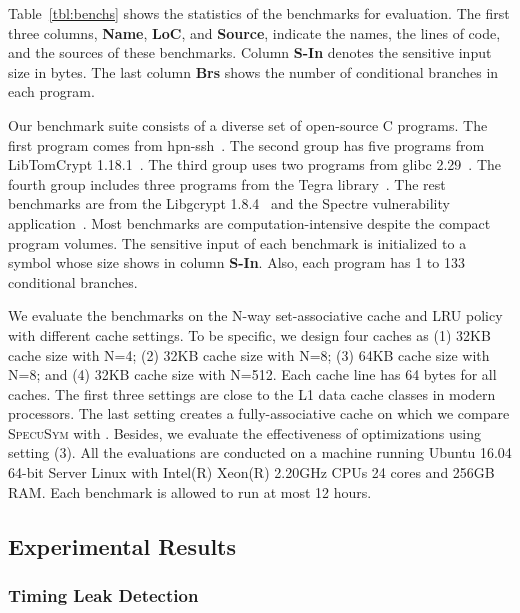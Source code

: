 \documentclass[sigconf,screen]{acmart}
\newcommand{\SpecuSym}{\textsc{SpecuSym} }
\begin{document}
Table~\ref{tbl:benchs} shows the statistics of the benchmarks for evaluation.  
The first three columns, \textbf{Name}, \textbf{LoC}, and \textbf{Source}, 
indicate the names, the lines of code, and the sources of these benchmarks. 
Column \textbf{S-In} denotes the sensitive input size in bytes. The last 
column \textbf{Brs} shows the number of conditional branches in each program.


Our benchmark suite consists of a diverse set of open-source C programs. 
The first program comes from hpn-ssh~\cite{hpn-ssh}. The second group has 
five programs from LibTomCrypt 1.18.1~\cite{LibTomCrypt}. The third group 
uses two programs from glibc 2.29~\cite{glibc}. The fourth group includes 
three programs from the Tegra library~\cite{Tegra}. The rest benchmarks 
are from the Libgcrypt 1.8.4~\cite{Libgcrypt} and the Spectre vulnerability
application~\cite{spectre-attack}. Most benchmarks are computation-intensive 
despite the compact program volumes. The sensitive input of each benchmark 
is initialized to a symbol whose size shows in column \textbf{S-In}. Also, 
each program has 1 to 133 conditional branches.


We evaluate the benchmarks on the N-way set-associative cache and LRU policy 
with different cache settings. To be specific, we design four caches as (1) 
32KB cache size with N=4; (2) 32KB cache size with N=8; (3) 64KB cache size 
with N=8; and (4) 32KB cache size with N=512. Each cache line has 64 bytes 
for all caches. The first three settings are close to the L1 data cache 
classes in modern processors. The last setting creates a fully-associative 
cache on which we compare \SpecuSym with \cite{WuW19}. Besides, we evaluate 
the effectiveness of optimizations using setting (3). All the evaluations 
are conducted on a machine running Ubuntu 16.04 64-bit Server Linux with 
Intel(R) Xeon(R) 2.20GHz CPUs 24 cores and 256GB RAM. Each benchmark is 
allowed to run at most 12 hours.


\subsection{Experimental Results}
\label{sec:experiments}

\subsubsection{Timing Leak Detection}
\label{sec:leak_detect}
\end{document}
